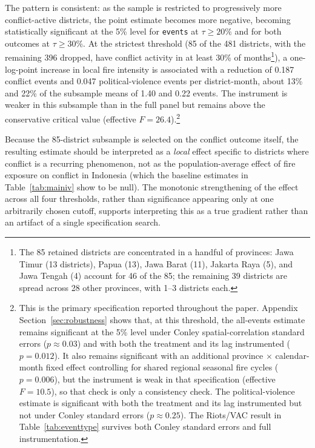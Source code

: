 \documentclass[12pt]{article}
\begin{document}
The pattern is consistent: as the sample is restricted to progressively more conflict-active districts, the point estimate becomes more negative, becoming statistically significant at the 5\% level for \texttt{events} at $\tau \geq 20\%$ and for both outcomes at $\tau \geq 30\%$. At the strictest threshold (85 of the 481 districts, with the remaining 396 dropped, have conflict activity in at least 30\% of months\footnote{The 85 retained districts are concentrated in a handful of provinces: Jawa Timur (13 districts), Papua (13), Jawa Barat (11), Jakarta Raya (5), and Jawa Tengah (4) account for 46 of the 85; the remaining 39 districts are spread across 28 other provinces, with 1--3 districts each.}), a one-log-point increase in local fire intensity is associated with a reduction of 0.187 conflict events and 0.047 political-violence events per district-month, about 13\% and 22\% of the subsample means of 1.40 and 0.22 events. The instrument is weaker in this subsample than in the full panel but remains above the conservative critical value (effective $F = 26.4$).\footnote{This is the primary specification reported throughout the paper. Appendix Section~\ref{sec:robustness} shows that, at this threshold, the all-events estimate remains significant at the 5\% level under Conley spatial-correlation standard errors ($p \approx 0.03$) and with both the treatment and its lag instrumented ($p=0.012$). It also remains significant with an additional province $\times$ calendar-month fixed effect controlling for shared regional seasonal fire cycles ($p=0.006$), but the instrument is weak in that specification (effective $F = 10.5$), so that check is only a consistency check. The political-violence estimate is significant with both the treatment and its lag instrumented but not under Conley standard errors ($p \approx 0.25$). The Riots/VAC result in Table~\ref{tab:eventtype} survives both Conley standard errors and full instrumentation.}

Because the 85-district subsample is selected on the conflict outcome itself, the resulting estimate should be interpreted as a \emph{local} effect specific to districts where conflict is a recurring phenomenon, not as the population-average effect of fire exposure on conflict in Indonesia (which the baseline estimates in Table~\ref{tab:mainiv} show to be null). The monotonic strengthening of the effect across all four thresholds, rather than significance appearing only at one arbitrarily chosen cutoff, supports interpreting this as a true gradient rather than an artifact of a single specification search.
\end{document}
